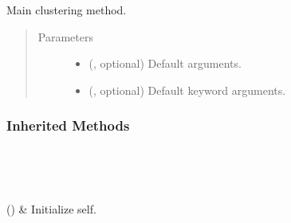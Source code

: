 \documentclass[letterpaper,10pt,english]{sphinxmanual}
\begin{document}
\begin{fulllineitems}
\begin{fulllineitems}
\label{\detokenize{api/generated/directional_clustering.clustering.ClusteringAlgorithm.cluster:directional_clustering.clustering.ClusteringAlgorithm.cluster}}
Main clustering method.
\begin{quote}\begin{description}
\item[{Parameters}] \leavevmode\begin{itemize}
\item {} 
 (, optional) \textendash{} Default arguments.

\item {} 
 (, optional) \textendash{} Default keyword arguments.

\end{itemize}

\end{description}\end{quote}

\end{fulllineitems}

\subsubsection*{Inherited Methods}


\begin{savenotes}\sphinxatlongtablestart\begin{longtable}[c]{}
\hline

\endfirsthead

%
{}\\
\hline

\endhead

\hline
{}\\
\endfoot

\endlastfoot

{\hyperref[\detokenize{api/generated/directional_clustering.clustering.ClusteringAlgorithm.__init__:directional_clustering.clustering.ClusteringAlgorithm.__init__}]{}}()
&
Initialize self.
\\
\hline
\end{longtable}\sphinxatlongtableend\end{savenotes}



\end{fulllineitems}
\end{document}
